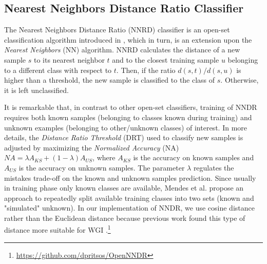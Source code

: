 \subsection{Nearest Neighbors Distance Ratio Classifier}\label{sec:NNRD_Description}

The Nearest Neighbors Distance Ratio (NNRD) classifier is an open-set classification algorithm introduced in \parencite{mendesjunior2016}, which in turn, is an extension upon the \textit{Nearest Neighbors} (NN) algorithm. NNRD calculates the distance of a new sample $s$ to its nearest neighbor $t$ and to the closest training sample $u$ belonging to a different class with respect to $t$. Then, if the ratio $d(s,t)/d(s,u)$ is higher than a threshold, the new sample is classified to the class of $s$. Otherwise, it is left unclassified. 

It is remarkable that, in contrast to other open-set classifiers, training of NNDR requires both known samples (belonging to classes known during training) and unknown examples (belonging to other/unknown classes) of interest. In more details, the \textit{Distance Ratio Threshold} (DRT) used to classify new samples is adjusted by maximizing the \textit{Normalized Accuracy} (NA)  $NA = \lambda A_{KS} + (1 - \lambda) A_{US}$, where $A_{KS}$ is the accuracy on known samples and $A_{US}$ is the accuracy on unknown samples. The parameter $\lambda$ regulates the mistakes trade-off on the known and unknown samples prediction. Since usually in training phase only known classes are available, Mendes et al. \parencite{mendesjunior2016} propose an approach to repeatedly split available training classes into two sets (known and "simulated" unknown). In our implementation of NNDR, we use cosine distance rather than the Euclidean distance because previous work found this type of distance more suitable for WGI \parencite{pritsos2018open}.\footnote{\url{https://github.com/dpritsos/OpenNNDR}}

